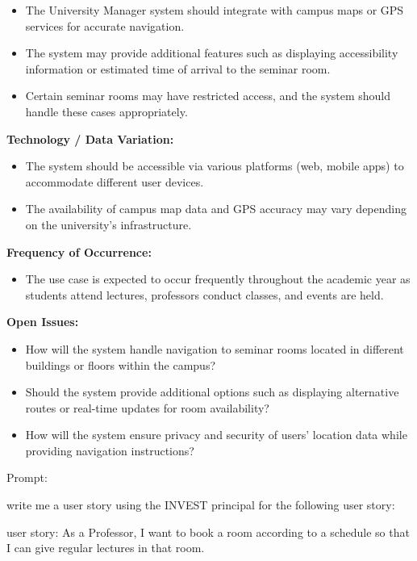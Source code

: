 \documentclass[article,onecolumn]{IEEEtran}
\begin{document}
\begin{framed}
	\begin{itemize}
		\item The University Manager system should integrate with campus maps or GPS services for accurate navigation.
		\item The system may provide additional features such as displaying accessibility information or estimated time of arrival to the seminar room.
		\item Certain seminar rooms may have restricted access, and the system should handle these cases appropriately.
	\end{itemize}
	
	\textbf{Technology / Data Variation:}
	
	\begin{itemize}
		\item The system should be accessible via various platforms (web, mobile apps) to accommodate different user devices.
		\item The availability of campus map data and GPS accuracy may vary depending on the university's infrastructure.
	\end{itemize}
	
	\textbf{Frequency of Occurrence:}
	
	\begin{itemize}
		\item The use case is expected to occur frequently throughout the academic year as students attend lectures, professors conduct classes, and events are held.
	\end{itemize}
	
	\textbf{Open Issues:}
	
	\begin{itemize}
		\item How will the system handle navigation to seminar rooms located in different buildings or floors within the campus?
		\item Should the system provide additional options such as displaying alternative routes or real-time updates for room availability?
		\item How will the system ensure privacy and security of users' location data while providing navigation instructions?
	\end{itemize}
\end{framed}

Prompt:
\begin{framed}
	\small
	write me a user story using the INVEST principal for the following user story:
	
	user story: As a Professor, I want to book a room according to a schedule so that I can give regular lectures in that room.
\end{framed}
\end{document}
